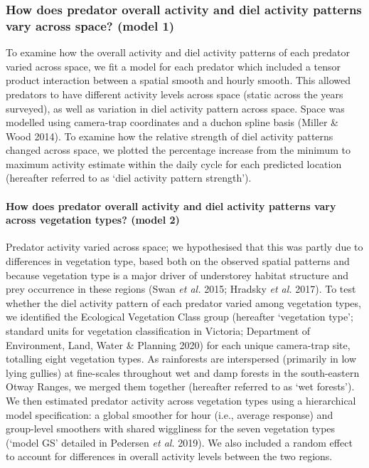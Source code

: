 \documentclass[]{elsarticle} %
\begin{document}
\hypertarget{how-does-predator-overall-activity-and-diel-activity-patterns-vary-across-space-model-1}{%
\subsubsection{How does predator overall activity and diel activity patterns vary across space? (model 1)}\label{how-does-predator-overall-activity-and-diel-activity-patterns-vary-across-space-model-1}}

To examine how the overall activity and diel activity patterns of each predator varied across space, we fit a model for each predator which included a tensor product interaction between a spatial smooth and hourly smooth. This allowed predators to have different activity levels across space (static across the years surveyed), as well as variation in diel activity pattern across space. Space was modelled using camera-trap coordinates and a duchon spline basis (Miller \& Wood 2014). To examine how the relative strength of diel activity patterns changed across space, we plotted the percentage increase from the minimum to maximum activity estimate within the daily cycle for each predicted location (hereafter referred to as `diel activity pattern strength').

\hypertarget{how-does-predator-overall-activity-and-diel-activity-patterns-vary-across-vegetation-types-model-2}{%
\paragraph{How does predator overall activity and diel activity patterns vary across vegetation types? (model 2)}\label{how-does-predator-overall-activity-and-diel-activity-patterns-vary-across-vegetation-types-model-2}}

Predator activity varied across space; we hypothesised that this was partly due to differences in vegetation type, based both on the observed spatial patterns and because vegetation type is a major driver of understorey habitat structure and prey occurrence in these regions (Swan \emph{et al.} 2015; Hradsky \emph{et al.} 2017). To test whether the diel activity pattern of each predator varied among vegetation types, we identified the Ecological Vegetation Class group (hereafter `vegetation type'; standard units for vegetation classification in Victoria; Department of Environment, Land, Water \& Planning 2020) for each unique camera-trap site, totalling eight vegetation types. As rainforests are interspersed (primarily in low lying gullies) at fine-scales throughout wet and damp forests in the south-eastern Otway Ranges, we merged them together (hereafter referred to as `wet forests'). We then estimated predator activity across vegetation types using a hierarchical model specification: a global smoother for hour (i.e., average response) and group-level smoothers with shared wiggliness for the seven vegetation types (`model GS' detailed in Pedersen \emph{et al.} 2019). We also included a random effect to account for differences in overall activity levels between the two regions.
\end{document}
